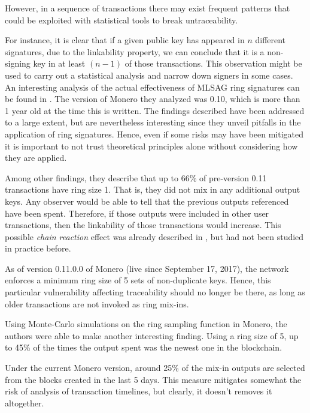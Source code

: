 However, in a sequence of transactions there may exist frequent patterns that could be exploited
with statistical tools to break untraceability.

For instance, it is clear that if a given public key has appeared in \(n\) different signatures, due to the linkability property, we can conclude that it is a non-signing key in at least \((n-1)\) of those transactions. This observation might be used to carry out a statistical analysis and narrow down signers in some cases.
\\


An interesting analysis of the actual effectiveness of MLSAG ring signatures can be found in \cite{AnalysisOfLinkability}.
The version of Monero they analyzed was 0.10, which is more than 1 year old at the time this is written. 
The findings described have
been addressed to a large extent, but are nevertheless interesting since they unveil pitfalls in the application
of ring signatures. Hence, even if some risks may have been mitigated it is important to not trust theoretical
principles alone without considering how they are applied.


Among other findings, they describe that up to 66\% of pre-version 0.11  transactions have ring size 1. 
That is, they did not mix in any additional
output keys. Any observer would be able to tell that the previous outputs referenced have been spent. 
Therefore, if those outputs were
included in other user transactions, then the linkability of those transactions would increase.
This possible {\em chain reaction} effect was already described in \cite{MRL-001}, but had not been studied in practice before.

As of version 0.11.0.0 of Monero (live since September 17\nth, 2017), the network enforces a minimum ring size of 
5 sets of non-duplicate keys. Hence, this particular vulnerability affecting traceability should no longer be there, as long as older
transactions are not invoked as ring mix-ins.

Using Monte-Carlo simulations on the ring sampling function in Monero,
the authors were able to make another interesting finding.
Using a ring size of 5, up to 45\% of the times the output spent was the newest one in the blockchain.

Under the current Monero version, around 25\% of the mix-in outputs are selected from the blocks created in the last
5 days. This measure mitigates somewhat the risk of analysis of transaction timelines, but clearly, it doesn't removes it altogether.
\\

